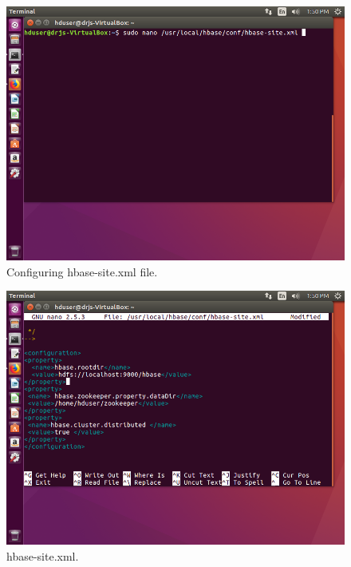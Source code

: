 \documentclass[a4paper,10pt]{article}
\begin{document}
\begin{figure}[h]
	\includegraphics[scale=0.33,center]{8.png}
	\caption{Configuring hbase-site.xml file.}
	\label{fig:1}
\end{figure}

\begin{figure}[h]
	\includegraphics[scale=0.33,center]{9.png}
	\caption{hbase-site.xml.}
	\label{fig:1}
\end{figure}
\end{document}
